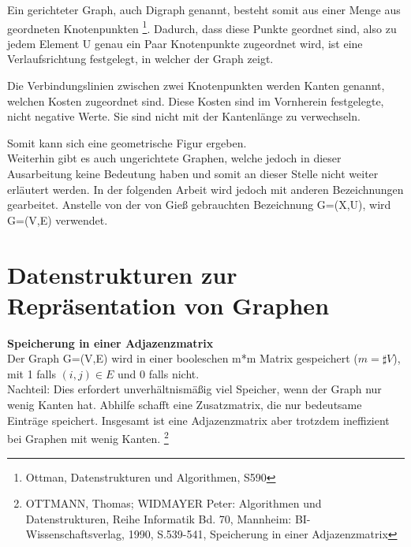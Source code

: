 Ein gerichteter Graph, auch Digraph genannt,  besteht somit aus einer Menge aus geordneten Knotenpunkten \footnote{Ottman, Datenstrukturen und Algorithmen, S590}. Dadurch, dass diese Punkte geordnet sind, also zu jedem Element U genau ein Paar Knotenpunkte zugeordnet wird, ist eine Verlaufsrichtung festgelegt, in welcher der Graph zeigt.

Die Verbindungslinien zwischen zwei Knotenpunkten werden Kanten genannt, welchen Kosten zugeordnet sind. Diese Kosten sind im Vornherein festgelegte, nicht negative Werte. Sie sind  nicht mit der Kantenlänge zu verwechseln.

Somit kann sich eine geometrische Figur ergeben.\\

Weiterhin gibt es auch ungerichtete Graphen, welche jedoch in dieser Ausarbeitung keine Bedeutung haben und somit an dieser Stelle nicht weiter erläutert werden.
In der folgenden Arbeit wird jedoch mit anderen Bezeichnungen gearbeitet. Anstelle von der von Gieß gebrauchten Bezeichnung G=(X,U), wird G=(V,E) verwendet.



\section{Datenstrukturen zur Repräsentation von Graphen}

\textbf{Speicherung in einer Adjazenzmatrix} \\
Der Graph G=(V,E) wird in einer booleschen m*m Matrix gespeichert ($m = \sharp V$), mit 1 falls $(i,j) \in E$ und 0 falls nicht. \\
Nachteil: Dies erfordert unverhältnismäßig viel Speicher, wenn der Graph nur wenig    	  Kanten hat. Abhilfe schafft eine Zusatzmatrix, die nur bedeutsame Einträge speichert.
 Insgesamt ist eine Adjazenzmatrix aber trotzdem ineffizient bei Graphen mit wenig Kanten. 
  \footnote{OTTMANN, Thomas; WIDMAYER Peter: Algorithmen und Datenstrukturen, Reihe Informatik Bd. 70, Mannheim: BI-Wissenschaftsverlag, 1990, S.539-541, Speicherung in einer Adjazenzmatrix}\\
 

